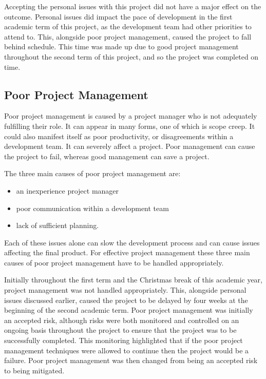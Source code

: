 \documentclass{article}
\begin{document}
Accepting the personal issues with this project did not have a major effect on the outcome. Personal issues did impact the pace of development in the first academic term of this project, as the development team had other priorities to attend to. This, alongside poor project management, caused the project to fall behind schedule. This time was made up due to good project management throughout the second term of this project, and so the project was completed on time. \par

\subsection{Poor Project Management}

Poor project management is caused by a project manager who is not adequately fulfilling their role. It can appear in many forms, one of which is scope creep. It could also manifest itself as poor productivity, or disagreements within a development team. It can severely affect a project. Poor management can cause the project to fail, whereas good management can save a project. \par

The three main causes of poor project management are:

\begin{itemize}
	\item an inexperience project manager
	\item poor communication within a development team
	\item lack of sufficient planning.
\end{itemize}

Each of these issues alone can slow the development process and can cause issues affecting the final product. For effective project management these three main causes of poor project management have to be handled appropriately. \par

Initially throughout the first term and the Christmas break of this academic year, project management was not handled appropriately. This, alongside personal issues discussed earlier, caused the project to be delayed by four weeks at the beginning of the second academic term. Poor project management was initially an accepted risk, although risks were both monitored and controlled on an ongoing basis throughout the project to ensure that the project was to be successfully completed. This monitoring highlighted that if the poor project management techniques were allowed to continue then the project would be a failure. Poor project management was then changed from being an accepted risk to being mitigated. \par
\end{document}
